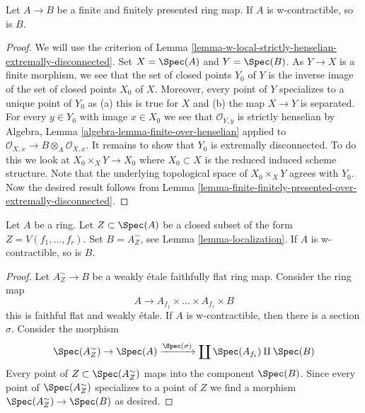 \begin{lemma}
\label{lemma-finite-finitely-presented-over-w-contractible}
Let $A \to B$ be a finite and finitely presented ring map.
If $A$ is w-contractible, so is $B$.
\end{lemma}

\begin{proof}
We will use the criterion of
Lemma \ref{lemma-w-local-strictly-henselian-extremally-disconnected}.
Set $X = \Spec(A)$ and $Y = \Spec(B)$.
As $Y \to X$ is a finite morphism, we see that the set of closed
points $Y_0$ of $Y$ is the inverse image of the set of closed points
$X_0$ of $X$. Moreover, every point of $Y$ specializes to a unique
point of $Y_0$ as (a) this is true for $X$ and (b) the map
$X \to Y$ is separated. For every $y \in Y_0$ with image $x \in X_0$
we see that $\mathcal{O}_{Y, y}$ is strictly henselian by
Algebra, Lemma \ref{algebra-lemma-finite-over-henselian}
applied to $\mathcal{O}_{X, x} \to B \otimes_A \mathcal{O}_{X, x}$.
It remains to show that $Y_0$ is extremally disconnected.
To do this we look at $X_0 \times_X Y \to X_0$
where $X_0 \subset X$ is the reduced induced scheme structure.
Note that the underlying topological space of
$X_0 \times_X Y$ agrees with $Y_0$. Now the desired result follows from
Lemma \ref{lemma-finite-finitely-presented-over-extremally-disconnected}.
\end{proof}

\begin{lemma}
\label{lemma-localization-w-contractible}
Let $A$ be a ring. Let $Z \subset \Spec(A)$ be a closed subset
of the form $Z = V(f_1, \ldots, f_r)$. Set $B = A_Z^\sim$, see
Lemma \ref{lemma-localization}. If $A$ is w-contractible, so is $B$.
\end{lemma}

\begin{proof}
Let $A_Z^\sim \to B$ be a weakly \'etale faithfully flat ring map.
Consider the ring map
$$
A \longrightarrow A_{f_1} \times \ldots \times A_{f_r} \times B
$$
this is faithful flat and weakly \'etale. If $A$ is w-contractible,
then there is a section $\sigma$. Consider the morphism
$$
\Spec(A_Z^\sim) \to \Spec(A) \xrightarrow{\Spec(\sigma)}
\coprod \Spec(A_{f_i}) \amalg \Spec(B)
$$
Every point of $Z \subset \Spec(A_Z^\sim)$ maps into the component
$\Spec(B)$. Since every point of $\Spec(A_Z^\sim)$ specializes to a
point of $Z$ we find a morphism $\Spec(A_Z^\sim) \to \Spec(B)$
as desired.
\end{proof}






